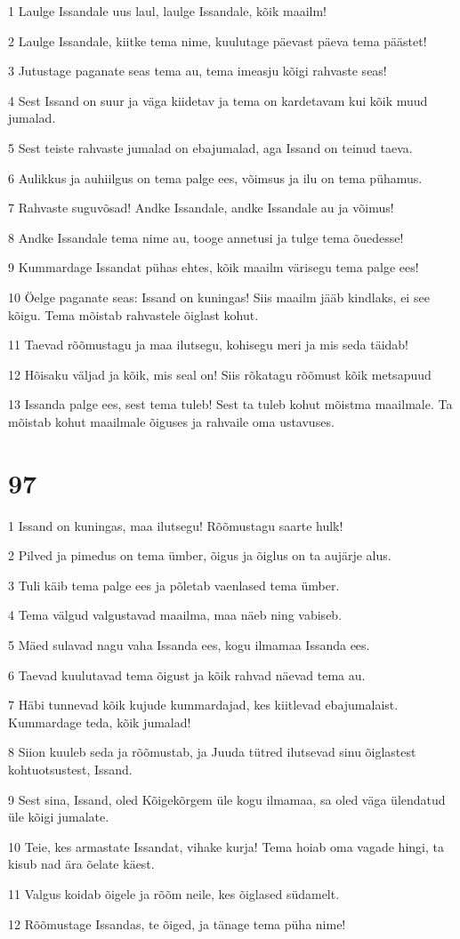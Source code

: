 \par 1 Laulge Issandale uus laul, laulge Issandale, kõik maailm!
\par 2 Laulge Issandale, kiitke tema nime, kuulutage päevast päeva tema päästet!
\par 3 Jutustage paganate seas tema au, tema imeasju kõigi rahvaste seas!
\par 4 Sest Issand on suur ja väga kiidetav ja tema on kardetavam kui kõik muud jumalad.
\par 5 Sest teiste rahvaste jumalad on ebajumalad, aga Issand on teinud taeva.
\par 6 Aulikkus ja auhiilgus on tema palge ees, võimsus ja ilu on tema pühamus.
\par 7 Rahvaste suguvõsad! Andke Issandale, andke Issandale au ja võimus!
\par 8 Andke Issandale tema nime au, tooge annetusi ja tulge tema õuedesse!
\par 9 Kummardage Issandat pühas ehtes, kõik maailm värisegu tema palge ees!
\par 10 Öelge paganate seas: Issand on kuningas! Siis maailm jääb kindlaks, ei see kõigu. Tema mõistab rahvastele õiglast kohut.
\par 11 Taevad rõõmustagu ja maa ilutsegu, kohisegu meri ja mis seda täidab!
\par 12 Hõisaku väljad ja kõik, mis seal on! Siis rõkatagu rõõmust kõik metsapuud
\par 13 Issanda palge ees, sest tema tuleb! Sest ta tuleb kohut mõistma maailmale. Ta mõistab kohut maailmale õiguses ja rahvaile oma ustavuses.

\chapter{97}

\par 1 Issand on kuningas, maa ilutsegu! Rõõmustagu saarte hulk!
\par 2 Pilved ja pimedus on tema ümber, õigus ja õiglus on ta aujärje alus.
\par 3 Tuli käib tema palge ees ja põletab vaenlased tema ümber.
\par 4 Tema välgud valgustavad maailma, maa näeb ning vabiseb.
\par 5 Mäed sulavad nagu vaha Issanda ees, kogu ilmamaa Issanda ees.
\par 6 Taevad kuulutavad tema õigust ja kõik rahvad näevad tema au.
\par 7 Häbi tunnevad kõik kujude kummardajad, kes kiitlevad ebajumalaist. Kummardage teda, kõik jumalad!
\par 8 Siion kuuleb seda ja rõõmustab, ja Juuda tütred ilutsevad sinu õiglastest kohtuotsustest, Issand.
\par 9 Sest sina, Issand, oled Kõigekõrgem üle kogu ilmamaa, sa oled väga ülendatud üle kõigi jumalate.
\par 10 Teie, kes armastate Issandat, vihake kurja! Tema hoiab oma vagade hingi, ta kisub nad ära õelate käest.
\par 11 Valgus koidab õigele ja rõõm neile, kes õiglased südamelt.
\par 12 Rõõmustage Issandas, te õiged, ja tänage tema püha nime!

